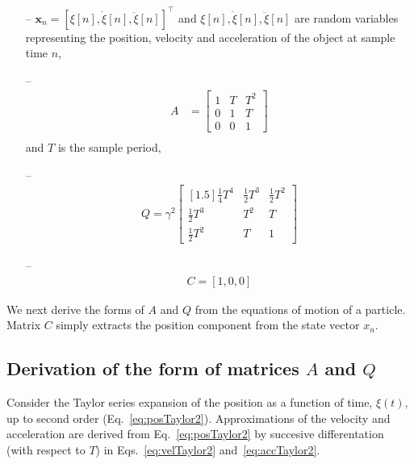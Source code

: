 \documentclass[fleqn]{article}
\begin{document}
\begin{itemize}

    \item[--]
        $\mathbf{x}_n=\left[\xi[n],\dot{\xi}[n],\ddot{\xi}[n]\right]^\intercal$
        and $\xi[n],\dot{\xi}[n],\ddot{\xi}[n]$ are random variables representing
        the position, velocity and acceleration of the object at sample time
        $n$,

    \item[--]
        \begin{align*}
            A&=\begin{bmatrix}
                1 & T & T^2\\
                0 & 1 & T\\
                0 & 0 & 1
            \end{bmatrix}\nonumber\\
        \end{align*}
        and $T$ is the sample period,

    \item[--]
        \begin{align*}
            Q=\gamma^2\begin{bmatrix}[1.5]
                \frac{1}{4}T^4&\frac{1}{2}T^3&\frac{1}{2}T^2\\
                \frac{1}{2}T^3&T^2&T\\
                \frac{1}{2}T^2&T&1
            \end{bmatrix}
        \end{align*}

    \item[--]
        \begin{align*}
            C = [1,0,0]
        \end{align*}
\end{itemize}

We next derive the forms of $A$ and $Q$ from the equations of motion of a
particle. Matrix $C$ simply extracts the position component from the state
vector $x_n$.

\subsection*{Derivation of the form of matrices $A$ and $Q$}

Consider the Taylor series expansion of the position as a function of time,
$\xi(t)$, up to second order (Eq.~\ref{eq:posTaylor2}). Approximations of the
velocity and acceleration are derived from Eq.~\ref{eq:posTaylor2} by
succesive differentation (with respect to $T$) in Eqs.~\ref{eq:velTaylor2}
and~\ref{eq:accTaylor2}.
\end{document}

